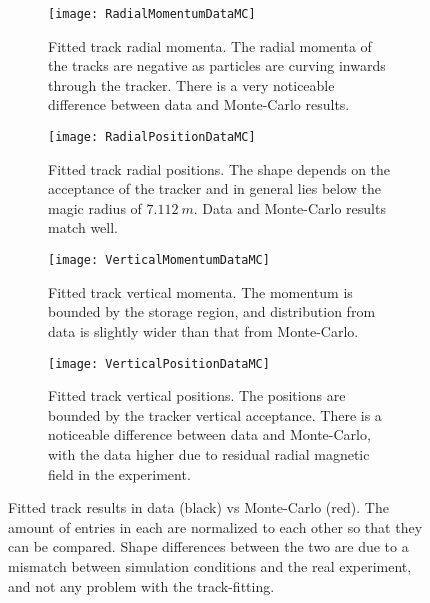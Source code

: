     \begin{figure}
    \centering
        \begin{subfigure}[t]{0.47\textwidth}
            \centering
            \texttt{[image: RadialMomentumDataMC]}
            \caption{Fitted track radial momenta. The radial momenta of the tracks are negative as particles are curving inwards through the tracker. There is a very noticeable difference between data and Monte-Carlo results.}
        \end{subfigure}
        \hspace{5mm}
        \begin{subfigure}[t]{0.47\textwidth}
            \centering
            \texttt{[image: RadialPositionDataMC]}
            \caption{Fitted track radial positions. The shape depends on the acceptance of the tracker and in general lies below the magic radius of $\SI{7.112}{m}$. Data and Monte-Carlo results match well.}
        \end{subfigure}
        \vspace{2mm}
        \begin{subfigure}[t]{0.47\textwidth}
            \centering
            \texttt{[image: VerticalMomentumDataMC]}
            \caption{Fitted track vertical momenta. The momentum is bounded by the storage region, and distribution from data is slightly wider than that from Monte-Carlo.}
        \end{subfigure}%
        \hspace{5mm}
        \begin{subfigure}[t]{0.47\textwidth}
            \centering
            \texttt{[image: VerticalPositionDataMC]}
            \caption{Fitted track vertical positions. The positions are bounded by the tracker vertical acceptance. There is a noticeable difference between data and Monte-Carlo, with the data higher due to residual radial magnetic field in the experiment.}
        \end{subfigure}%
    \caption[Fitted tracks in data compared to Monte-Carlo, radial and vertical momentum and position distributions]{Fitted track results in data (black) vs Monte-Carlo (red). The amount of entries in each are normalized to each other so that they can be compared. Shape differences between the two are due to a mismatch between simulation conditions and the real experiment, and not any problem with the track-fitting.}
    \label{fig:TracksDataMCSecond}
    \end{figure}



